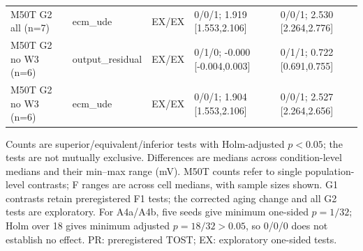 \begin{table}[t]
\begin{tabular}{lllll}
M50T G2 all (n=7) & ecm\_ude & EX/EX & 0/0/1; 1.919 [1.553,2.106] & 0/0/1; 2.530 [2.264,2.776] \\
M50T G2 no W3 (n=6) & output\_residual & EX/EX & 0/1/0; -0.000 [-0.004,0.003] & 0/1/1; 0.722 [0.691,0.755] \\
M50T G2 no W3 (n=6) & ecm\_ude & EX/EX & 0/0/1; 1.904 [1.553,2.106] & 0/0/1; 2.527 [2.264,2.656] \\
\bottomrule
\end{tabular}
\vspace{2pt}
\parbox{\textwidth}{\footnotesize Counts are superior/equivalent/inferior tests with Holm-adjusted $p<0.05$; the tests are not mutually exclusive. Differences are medians across condition-level medians and their min--max range (mV). M50T counts refer to single population-level contrasts; F ranges are across cell medians, with sample sizes shown. G1 contrasts retain preregistered F1 tests; the corrected aging change and all G2 tests are exploratory. For A4a/A4b, five seeds give minimum one-sided $p=1/32$; Holm over 18 gives minimum adjusted $p=18/32>0.05$, so 0/0/0 does not establish no effect. PR: preregistered TOST; EX: exploratory one-sided tests.}
\end{table}
